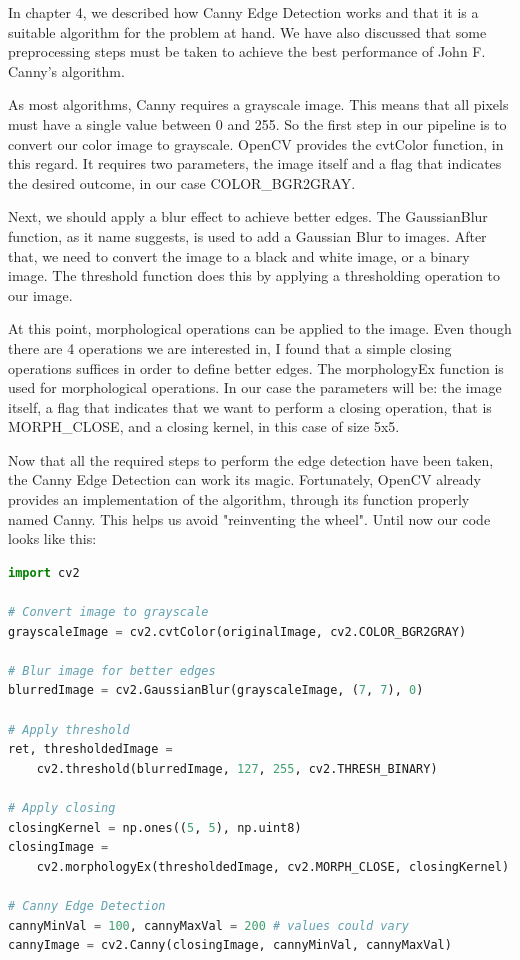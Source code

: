 \documentclass[12pt,a4paper,twoside]{report}
\begin{document}
In chapter 4, we described how Canny Edge Detection works and that it is a suitable algorithm for the problem at hand. We have also discussed that some preprocessing steps must be taken to achieve the best performance of John F. Canny's algorithm.

As most algorithms, Canny requires a grayscale image. This means that all pixels must have a single value between 0 and 255. So the first step in our pipeline is to convert our color image to grayscale. OpenCV provides the cvtColor function, in this regard. It requires two parameters, the image itself and a flag that indicates the desired outcome, in our case COLOR\_BGR2GRAY.

Next, we should apply a blur effect to achieve better edges. The GaussianBlur function, as it name suggests, is used to add a Gaussian Blur to images. After that, we need to convert the image to a black and white image, or a binary image. The threshold function does this by applying a thresholding operation to our image.

At this point, morphological operations can be applied to the image. Even though there are 4 operations we are interested in, I found that a simple closing operations suffices in order to define better edges. The morphologyEx function is used for morphological operations. In our case the parameters will be: the image itself, a flag that indicates that we want to perform a closing operation, that is MORPH\_CLOSE, and a closing kernel, in this case of size 5x5.

Now that all the required steps to perform the edge detection have been taken, the Canny Edge Detection can work its magic. Fortunately, OpenCV already provides an implementation of the algorithm, through its function properly named Canny. This helps us avoid "reinventing the wheel". Until now our code looks like this: 
\begin{lstlisting}[language=Python]
import cv2

# Convert image to grayscale
grayscaleImage = cv2.cvtColor(originalImage, cv2.COLOR_BGR2GRAY)

# Blur image for better edges
blurredImage = cv2.GaussianBlur(grayscaleImage, (7, 7), 0)

# Apply threshold
ret, thresholdedImage = 
    cv2.threshold(blurredImage, 127, 255, cv2.THRESH_BINARY)

# Apply closing
closingKernel = np.ones((5, 5), np.uint8)
closingImage = 
    cv2.morphologyEx(thresholdedImage, cv2.MORPH_CLOSE, closingKernel)

# Canny Edge Detection
cannyMinVal = 100, cannyMaxVal = 200 # values could vary
cannyImage = cv2.Canny(closingImage, cannyMinVal, cannyMaxVal)
\end{lstlisting}
\end{document}
